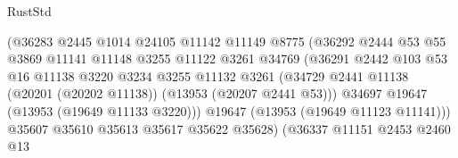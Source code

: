 \begin{lexlean}{RustStd}
\begin{coremodule}
                                        (@36283
                                          @2445
                                          @1014
                                          @24105
                                          @11142
                                          @11149
                                          @8775
                                          (@36292
                                            @2444
                                            @53
                                            @55
                                            @3869
                                            @11141
                                            @11148
                                            @3255
                                            @11122
                                            @3261
                                            @34769
                                            (@36291
                                              @2442
                                              @103
                                              @53
                                              @16
                                              @11138
                                              @3220
                                              @3234
                                              @3255
                                              @11132
                                              @3261
                                              (@34729
                                                @2441
                                                @11138
                                                (@20201 (@20202 @11138))
                                                (@13953 (@20207 @2441 @53)))
                                              @34697
                                              @19647
                                              (@13953 (@19649 @11133 @3220)))
                                            @19647
                                            (@13953 (@19649 @11123 @11141)))
                                          @35607
                                          @35610
                                          @35613
                                          @35617
                                          @35622
                                          @35628)
                                        (@36337
                                          @11151
                                          @2453
                                          @2460
                                          @13

\end{coremodule}
\end{lexlean}
